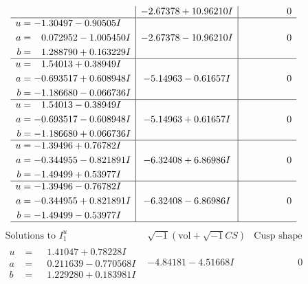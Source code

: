\documentclass[1p]{elsarticle_modified}
\theoremstyle{definition}
\newcommand{\I}{\sqrt{-1}}
\begin{document}
$$\begin{array}{c|c|c}
 & -2.67378 + 10.96210 I & \phantom{-0.000000 } 0 \\ \hline\begin{aligned}
u &= -1.30497 - 0.90505 I \\
a &= \phantom{-}0.072952 - 1.005450 I \\
b &= \phantom{-}1.288790 + 0.163229 I\end{aligned}
 & -2.67378 - 10.96210 I & \phantom{-0.000000 } 0 \\ \hline\begin{aligned}
u &= \phantom{-}1.54013 + 0.38949 I \\
a &= -0.693517 + 0.608948 I \\
b &= -1.186680 - 0.066736 I\end{aligned}
 & -5.14963 - 0.61657 I & \phantom{-0.000000 } 0 \\ \hline\begin{aligned}
u &= \phantom{-}1.54013 - 0.38949 I \\
a &= -0.693517 - 0.608948 I \\
b &= -1.186680 + 0.066736 I\end{aligned}
 & -5.14963 + 0.61657 I & \phantom{-0.000000 } 0 \\ \hline\begin{aligned}
u &= -1.39496 + 0.76782 I \\
a &= -0.344955 - 0.821891 I \\
b &= -1.49499 + 0.53977 I\end{aligned}
 & -6.32408 + 6.86986 I & \phantom{-0.000000 } 0 \\ \hline\begin{aligned}
u &= -1.39496 - 0.76782 I \\
a &= -0.344955 + 0.821891 I \\
b &= -1.49499 - 0.53977 I\end{aligned}
 & -6.32408 - 6.86986 I & \phantom{-0.000000 } 0\\
 \hline 
 \end{array}$$\newpage$$\begin{array}{c|c|c}  
\text{Solutions to }I^u_{1}& \I (\text{vol} + \sqrt{-1}CS) & \text{Cusp shape}\\
 \hline 
\begin{aligned}
u &= \phantom{-}1.41047 + 0.78228 I \\
a &= \phantom{-}0.211639 - 0.770568 I \\
b &= \phantom{-}1.229280 + 0.183981 I\end{aligned}
 & -4.84181 - 4.51668 I & \phantom{-0.000000 } 0 \\ \hline\begin{aligned}

\end{aligned}
\end{array}$$
\end{document}
